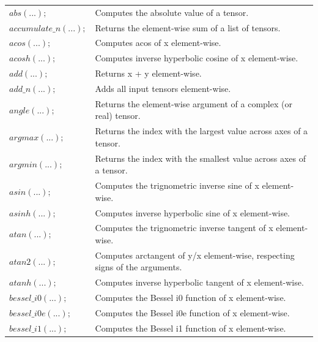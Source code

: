 \documentclass[12pt]{report}
\begin{document}
\begin{longtable}{ p{} | p{}} 
\hline
$abs(...);$ & Computes the absolute value of a tensor. \\

$accumulate\_n(...);$ & Returns the element-wise sum of a list of tensors. \\

$acos(...);$ & Computes acos of x element-wise. \\ 

$acosh(...);$ & Computes inverse hyperbolic cosine of x element-wise. \\ 

$add(...);$ & Returns x + y element-wise. \\ 

$add\_n(...);$ & Adds all input tensors element-wise. \\ 

$angle(...);$ & Returns the element-wise argument of a complex (or real) tensor. \\ 

$argmax(...);$ & Returns the index with the largest value across axes of a tensor. \\ 

$argmin(...);$ & Returns the index with the smallest value across axes of a tensor. \\ 

$asin(...);$ & Computes the trignometric inverse sine of x element-wise. \\ 

$asinh(...);$ & Computes inverse hyperbolic sine of x element-wise. \\ 

$atan(...);$ & Computes the trignometric inverse tangent of x element-wise. \\ 

$atan2(...);$ & Computes arctangent of y/x element-wise, respecting signs of the arguments. \\ 

$atanh(...);$ & Computes inverse hyperbolic tangent of x element-wise. \\ 

$bessel\_i0(...);$ & Computes the Bessel i0 function of x element-wise. \\ 

$bessel\_i0e(...);$ & Computes the Bessel i0e function of x element-wise. \\ 

$bessel\_i1(...);$ & Computes the Bessel i1 function of x element-wise. \\ 


\end{longtable}
\end{document}

